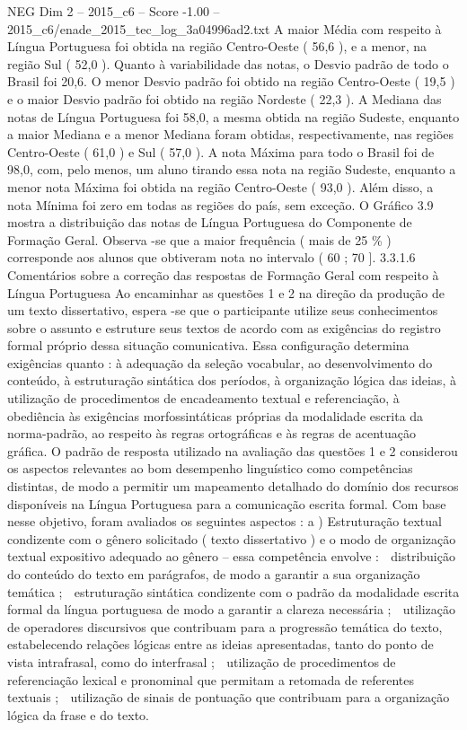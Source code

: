 \begin{textsample}{NEG Dim 2 – 2015\_c6 – Score -1.00 – 2015\_c6/enade\_2015\_tec\_log\_3a04996ad2.txt}
A maior Média com respeito à Língua Portuguesa foi obtida na região Centro-Oeste ( 56,6 ), e a menor, na região Sul ( 52,0 ).
Quanto à variabilidade das notas, o Desvio padrão de todo o Brasil foi 20,6.
O menor Desvio padrão foi obtido na região Centro-Oeste ( 19,5 ) e o maior Desvio padrão foi obtido na região Nordeste ( 22,3 ).
A Mediana das notas de Língua Portuguesa foi 58,0, a mesma obtida na região Sudeste, enquanto a maior Mediana e a menor Mediana foram obtidas, respectivamente, nas regiões Centro-Oeste ( 61,0 ) e Sul ( 57,0 ).
A nota Máxima para todo o Brasil foi de 98,0, com, pelo menos, um aluno tirando essa nota na região Sudeste, enquanto a menor nota Máxima foi obtida na região Centro-Oeste ( 93,0 ).
Além disso, a nota Mínima foi zero em todas as regiões do país, sem exceção.
O Gráfico 3.9 mostra a distribuição das notas de Língua Portuguesa do Componente de Formação Geral.
Observa -se que a maior frequência ( mais de 25 \% ) corresponde aos alunos que obtiveram nota no intervalo ( 60 ; 70 ]. 3.3.1.6 Comentários sobre a correção das respostas de Formação Geral com respeito à Língua Portuguesa Ao encaminhar as questões 1 e 2 na direção da produção de um texto dissertativo, espera -se que o participante utilize seus conhecimentos sobre o assunto e estruture seus textos de acordo com as exigências do registro formal próprio dessa situação comunicativa.
Essa configuração determina exigências quanto : à adequação da seleção vocabular, ao desenvolvimento do conteúdo, à estruturação sintática dos períodos, à organização lógica das ideias, à utilização de procedimentos de encadeamento textual e referenciação, à obediência às exigências morfossintáticas próprias da modalidade escrita da norma-padrão, ao respeito às regras ortográficas e às regras de acentuação gráfica.
O padrão de resposta utilizado na avaliação das questões 1 e 2 considerou os aspectos relevantes ao bom desempenho linguístico como competências distintas, de modo a permitir um mapeamento detalhado do domínio dos recursos disponíveis na Língua Portuguesa para a comunicação escrita formal.
Com base nesse objetivo, foram avaliados os seguintes aspectos : a ) Estruturação textual condizente com o gênero solicitado ( texto dissertativo ) e o modo de organização textual expositivo adequado ao gênero – essa competência envolve :  distribuição do conteúdo do texto em parágrafos, de modo a garantir a sua organização temática ;  estruturação sintática condizente com o padrão da modalidade escrita formal da língua portuguesa de modo a garantir a clareza necessária ;  utilização de operadores discursivos que contribuam para a progressão temática do texto, estabelecendo relações lógicas entre as ideias apresentadas, tanto do ponto de vista intrafrasal, como do interfrasal ;  utilização de procedimentos de referenciação lexical e pronominal que permitam a retomada de referentes textuais ;  utilização de sinais de pontuação que contribuam para a organização lógica da frase e do texto.

\end{textsample}
